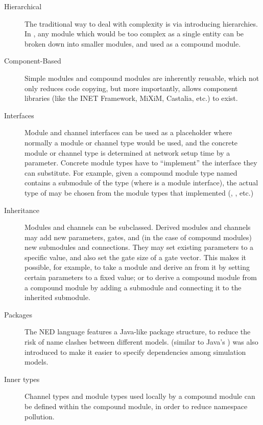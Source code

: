 \begin{description}

\item[Hierarchical] The traditional way to deal with complexity is via
introducing hierarchies. In {\opp}, any module which would be too complex as
a single entity can be broken down into smaller modules, and used as a
compound module.

\item[Component-Based] Simple modules and compound modules are inherently
reusable, which not only reduces code copying, but more importantly, allows
component libraries (like the INET Framework, MiXiM, Castalia, etc.) to
exist.

\item[Interfaces] Module and channel interfaces can be used as a
placeholder where normally a module or channel type would be used, and the
concrete module or channel type is determined at network setup time by a
parameter. Concrete module types have to ``implement'' the interface they
can substitute. For example, given a compound module type named
 contains a  submodule of the type
 (where  is a module interface), the actual
type of  may be chosen from the module types that implemented
 (, , etc.)

\item[Inheritance] Modules and channels can be subclassed. Derived modules
and channels may add new parameters, gates, and (in the case of compound
modules) new submodules and connections. They may set existing parameters
to a specific value, and also set the gate size of a gate vector. This
makes it possible, for example, to take a  module
and derive an  from it by setting certain parameters to a fixed
value; or to derive a  compound module from a
 compound module by adding a  submodule and
connecting it to the inherited  submodule.

\item[Packages] The NED language features a Java-like package structure,
to reduce the risk of name clashes between different models. 
(similar to Java's ) was also introduced to make it easier
to specify dependencies among simulation models.

\item[Inner types] Channel types and module types used locally by a
compound module can be defined within the compound module, in order to
reduce namespace pollution.


\end{description}
